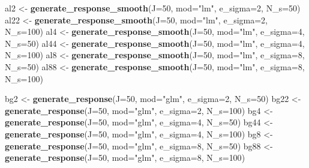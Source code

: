 \documentclass[
]{article}
\newenvironment{Shaded}{\begin{snugshade}}{\end{snugshade}}
\newcommand{\DataTypeTok}[1]{\textcolor[rgb]{0.13,0.29,0.53}{#1}}
\newcommand{\DecValTok}[1]{\textcolor[rgb]{0.00,0.00,0.81}{#1}}
\newcommand{\KeywordTok}[1]{\textcolor[rgb]{0.13,0.29,0.53}{\textbf{#1}}}
\newcommand{\NormalTok}[1]{#1}
\newcommand{\StringTok}[1]{\textcolor[rgb]{0.31,0.60,0.02}{#1}}
\begin{document}
\begin{Shaded}
\begin{Highlighting}[]
\NormalTok{al2 <-}\StringTok{ }\KeywordTok{generate_response_smooth}\NormalTok{(}\DataTypeTok{J=}\DecValTok{50}\NormalTok{, }\DataTypeTok{mod=}\StringTok{"lm"}\NormalTok{, }\DataTypeTok{e_sigma=}\DecValTok{2}\NormalTok{, }\DataTypeTok{N_s=}\DecValTok{50}\NormalTok{)}
\NormalTok{al22 <-}\StringTok{ }\KeywordTok{generate_response_smooth}\NormalTok{(}\DataTypeTok{J=}\DecValTok{50}\NormalTok{, }\DataTypeTok{mod=}\StringTok{"lm"}\NormalTok{, }\DataTypeTok{e_sigma=}\DecValTok{2}\NormalTok{, }\DataTypeTok{N_s=}\DecValTok{100}\NormalTok{)}
\NormalTok{al4 <-}\StringTok{ }\KeywordTok{generate_response_smooth}\NormalTok{(}\DataTypeTok{J=}\DecValTok{50}\NormalTok{, }\DataTypeTok{mod=}\StringTok{"lm"}\NormalTok{, }\DataTypeTok{e_sigma=}\DecValTok{4}\NormalTok{, }\DataTypeTok{N_s=}\DecValTok{50}\NormalTok{)}
\NormalTok{al44 <-}\StringTok{ }\KeywordTok{generate_response_smooth}\NormalTok{(}\DataTypeTok{J=}\DecValTok{50}\NormalTok{, }\DataTypeTok{mod=}\StringTok{"lm"}\NormalTok{, }\DataTypeTok{e_sigma=}\DecValTok{4}\NormalTok{, }\DataTypeTok{N_s=}\DecValTok{100}\NormalTok{)}
\NormalTok{al8 <-}\StringTok{ }\KeywordTok{generate_response_smooth}\NormalTok{(}\DataTypeTok{J=}\DecValTok{50}\NormalTok{, }\DataTypeTok{mod=}\StringTok{"lm"}\NormalTok{, }\DataTypeTok{e_sigma=}\DecValTok{8}\NormalTok{, }\DataTypeTok{N_s=}\DecValTok{50}\NormalTok{)}
\NormalTok{al88 <-}\StringTok{ }\KeywordTok{generate_response_smooth}\NormalTok{(}\DataTypeTok{J=}\DecValTok{50}\NormalTok{, }\DataTypeTok{mod=}\StringTok{"lm"}\NormalTok{, }\DataTypeTok{e_sigma=}\DecValTok{8}\NormalTok{, }\DataTypeTok{N_s=}\DecValTok{100}\NormalTok{)}


\NormalTok{bg2 <-}\StringTok{ }\KeywordTok{generate_response}\NormalTok{(}\DataTypeTok{J=}\DecValTok{50}\NormalTok{, }\DataTypeTok{mod=}\StringTok{"glm"}\NormalTok{, }\DataTypeTok{e_sigma=}\DecValTok{2}\NormalTok{, }\DataTypeTok{N_s=}\DecValTok{50}\NormalTok{)}
\NormalTok{bg22 <-}\StringTok{ }\KeywordTok{generate_response}\NormalTok{(}\DataTypeTok{J=}\DecValTok{50}\NormalTok{, }\DataTypeTok{mod=}\StringTok{"glm"}\NormalTok{, }\DataTypeTok{e_sigma=}\DecValTok{2}\NormalTok{, }\DataTypeTok{N_s=}\DecValTok{100}\NormalTok{)}
\NormalTok{bg4 <-}\StringTok{ }\KeywordTok{generate_response}\NormalTok{(}\DataTypeTok{J=}\DecValTok{50}\NormalTok{, }\DataTypeTok{mod=}\StringTok{"glm"}\NormalTok{, }\DataTypeTok{e_sigma=}\DecValTok{4}\NormalTok{, }\DataTypeTok{N_s=}\DecValTok{50}\NormalTok{)}
\NormalTok{bg44 <-}\StringTok{ }\KeywordTok{generate_response}\NormalTok{(}\DataTypeTok{J=}\DecValTok{50}\NormalTok{, }\DataTypeTok{mod=}\StringTok{"glm"}\NormalTok{, }\DataTypeTok{e_sigma=}\DecValTok{4}\NormalTok{, }\DataTypeTok{N_s=}\DecValTok{100}\NormalTok{)}
\NormalTok{bg8 <-}\StringTok{ }\KeywordTok{generate_response}\NormalTok{(}\DataTypeTok{J=}\DecValTok{50}\NormalTok{, }\DataTypeTok{mod=}\StringTok{"glm"}\NormalTok{, }\DataTypeTok{e_sigma=}\DecValTok{8}\NormalTok{, }\DataTypeTok{N_s=}\DecValTok{50}\NormalTok{)}
\NormalTok{bg88 <-}\StringTok{ }\KeywordTok{generate_response}\NormalTok{(}\DataTypeTok{J=}\DecValTok{50}\NormalTok{, }\DataTypeTok{mod=}\StringTok{"glm"}\NormalTok{, }\DataTypeTok{e_sigma=}\DecValTok{8}\NormalTok{, }\DataTypeTok{N_s=}\DecValTok{100}\NormalTok{)}


\end{Highlighting}
\end{Shaded}
\end{document}
